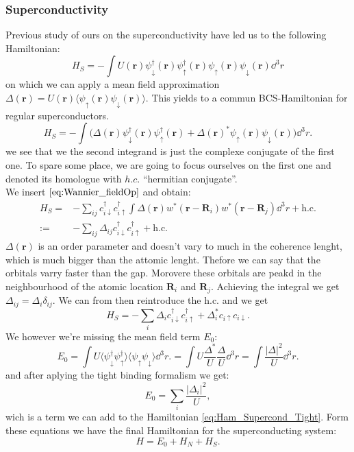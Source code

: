 \documentclass[../main.tex]{subfile}
\begin{document}
\subsubsection{Superconductivity}
Previous study of ours on the superconductivity have led us to the following Hamiltonian:
\[
    H_S = - \int U(\bm{r}) \psi_{\downarrow}^{\dagger}(\bm{r})\psi_{\uparrow}^{\dagger}(\bm{r})\psi_{\uparrow}(\bm{r})\psi_{\downarrow}(\bm{r}) \dd^3r
\]
on which we can apply a mean field approximation $\Delta(\bm{r}) = U(\bm{r})\langle \psi_{\uparrow}(\bm{r})\psi_{\downarrow}(\bm{r})\rangle$.
This yields to a commun BCS-Hamiltonian for regular superconductors.\\
\[
    H_S = - \int \biggl(\Delta(\bm{r}) \psi_{\downarrow}^{\dagger}(\bm{r})\psi_{\uparrow}^{\dagger}(\bm{r}) + \Delta(\bm{r})^{\ast}\psi_{\uparrow}(\bm{r})\psi_{\downarrow}(\bm{r})\biggr) \dd^3r.
\]  
we see that we the second integrand is just the complexe conjugate of the first one. 
To spare some place, we are going to focus ourselves on the first one and denoted its homologue with $h.c.$ ``hermitian conjugate''.\\
We insert $\ref{eq:Wannier_fieldOp}$ and obtain:
\begin{align*}
    H_S =& - \sum_{ij} c_{i\downarrow}^{\dagger}c_{i\uparrow}^{\dagger} \int \Delta(\bm{r}) w^{\ast}(\bm{r} - \bm{R}_i) w^{\ast}(\bm{r} - \bm{R}_j) \dd^3r + \text{h.c.}\\
    :=& -\sum_{ij} \Delta_{ij} c_{i\downarrow}^{\dagger}c_{i\uparrow}^{\dagger} + \text{h.c.}
\end{align*}
$\Delta(\bm{r})$ is an order parameter and doesn't vary to much in the coherence lenght, which is much bigger than the attomic lenght.
Thefore we can say that the orbitals varry faster than the gap. Morovere these orbitals are peakd in the neighbourhood of the atomic location $\bm{R}_i$ and $\bm{R}_j$.
Achieving the integral we get $\Delta_{ij} = \Delta_i \delta_{ij}$. We can from then reintroduce the h.c. and we get
\begin{equation}\label{eq:Ham_Supercond_Tight}
    H_S = -\sum_{i} \Delta_i c_{i\downarrow}^{\dagger}c_{i\uparrow}^{\dagger} + \Delta_i^{\ast} c_{i\uparrow}c_{i\downarrow}.
\end{equation}
We however we're missing the mean field term $E_0$:
\[
    E_0 = \int U \langle \psi_{\downarrow}^{\dagger}\psi_{\uparrow}^{\dagger}\rangle \langle\psi_{\uparrow}\psi_{\downarrow}\rangle \dd^3r. = \int U \frac{\Delta^{\ast}}{U}\frac{\Delta}{U} \dd^3r = \int \frac{|\Delta|^2}{U} \dd^3r.
\]
and after aplying the tight binding formalism we get:
\[
    E_0 = \sum_{i} \frac{|\Delta_i|^2}{U},
\]
wich is a term we can add to the Hamiltonian \ref{eq:Ham_Supercond_Tight}. Form these equations we have the final 
Hamiltonian for the superconducting system:
\[
    H = E_0 + H_N + H_S.
\]  
\end{document}
